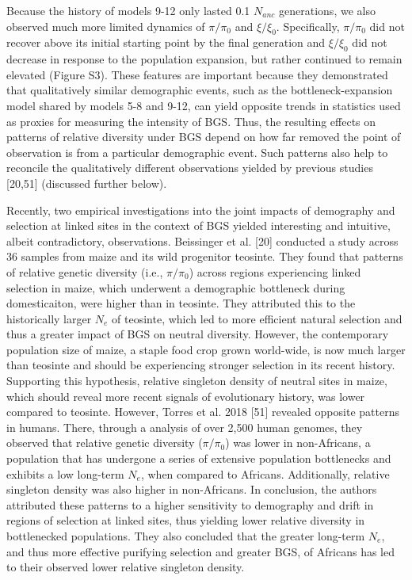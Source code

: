 \documentclass[9pt,twocolumn,twoside]{rilabRxiv}
\begin{document}
Because the history of models 9-12 only lasted 0.1
$N_{anc}$ generations, we also observed much more
limited dynamics of $\pi/\pi_0$ and $\xi/\xi_0$.
Specifically, $\pi/\pi_0$ did not recover above its initial
starting point by the final generation and $\xi/\xi_0$ did not
decrease in response to the population expansion, but rather continued
to remain elevated (Figure S3). These features are important because
they demonstrated that qualitatively similar demographic events, such as
the bottleneck-expansion model shared by models 5-8 and 9-12, can yield
opposite trends in statistics used as proxies for measuring the
intensity of BGS. Thus, the resulting effects on patterns of relative
diversity under BGS depend on how far removed the point of observation
is from a particular demographic event. Such patterns also help to
reconcile the qualitatively different observations yielded by previous
studies [20,51] (discussed further below).


Recently, two empirical investigations into the joint impacts of
demography and selection at linked sites in the context of BGS yielded
interesting and intuitive, albeit contradictory, observations.
Beissinger et al. [20] conducted a study across 36 samples from
maize and its wild progenitor teosinte. They found that patterns of
relative genetic diversity (i.e., $\pi/\pi_0$) across regions
experiencing linked selection in maize, which underwent a demographic
bottleneck during domesticaiton, were higher than in teosinte. They
attributed this to the historically larger $N_e$ of
teosinte, which led to more efficient natural selection and thus a
greater impact of BGS on neutral diversity. However, the contemporary
population size of maize, a staple food crop grown world-wide, is now
much larger than teosinte and should be experiencing stronger selection
in its recent history. Supporting this hypothesis, relative singleton
density of neutral sites in maize, which should reveal more recent
signals of evolutionary history, was lower compared to teosinte.
However, Torres et al. 2018 [51] revealed opposite patterns in
humans. There, through a analysis of over 2,500 human genomes, they
observed that relative genetic diversity ($\pi/\pi_0$) was
lower in non-Africans, a population that has undergone a series of
extensive population bottlenecks and exhibits a low long-term
$N_e$, when compared to Africans. Additionally,
relative singleton density was also higher in non-Africans. In
conclusion, the authors attributed these patterns to a higher
sensitivity to demography and drift in regions of selection at linked
sites, thus yielding lower relative diversity in bottlenecked
populations. They also concluded that the greater long-term
$N_e$, and thus more effective purifying selection
and greater BGS, of Africans has led to their observed lower relative
singleton density.
\end{document}
